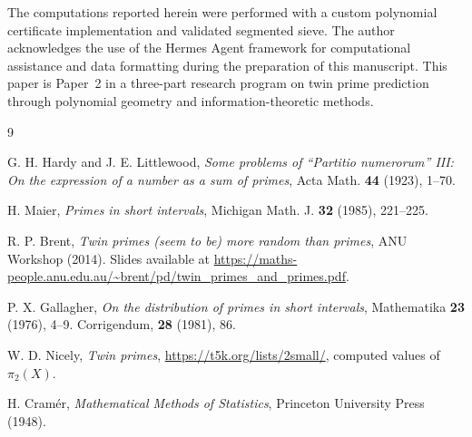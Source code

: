 \documentclass[11pt]{article}
\begin{document}
The computations reported herein were performed with a custom polynomial
certificate implementation and validated segmented sieve. The author
acknowledges the use of the Hermes Agent framework for computational
assistance and data formatting during the preparation of this manuscript.
This paper is Paper~2 in a three-part research program on twin prime
prediction through polynomial geometry and information-theoretic methods.

\begin{thebibliography}{9}

G. H. Hardy and J. E. Littlewood,
\textit{Some problems of ``Partitio numerorum'' III: On the expression of a number as a sum of primes},
Acta Math. \textbf{44} (1923), 1--70.

H. Maier,
\textit{Primes in short intervals},
Michigan Math. J. \textbf{32} (1985), 221--225.

R. P. Brent,
\textit{Twin primes (seem to be) more random than primes},
ANU Workshop (2014). Slides available at \url{https://maths-people.anu.edu.au/~brent/pd/twin_primes_and_primes.pdf}.

P. X. Gallagher,
\textit{On the distribution of primes in short intervals},
Mathematika \textbf{23} (1976), 4--9. Corrigendum, \textbf{28} (1981), 86.

W. D. Nicely,
\textit{Twin primes},
\url{https://t5k.org/lists/2small/}, computed values of $\pi_2(X)$.

H. Cram\'{e}r,
\textit{Mathematical Methods of Statistics},
Princeton University Press (1948).

\end{thebibliography}
\end{document}
